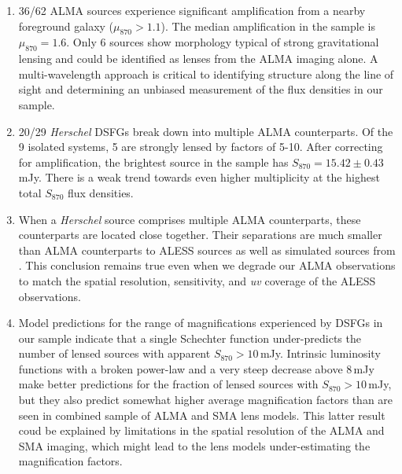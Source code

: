 \documentclass[iop]{emulateapj}
\begin{document}
\begin{enumerate}

    \item 36/62 ALMA sources experience significant amplification from a nearby
        foreground galaxy ($\mu_{870} > 1.1$).  The median amplification in the
        sample is $\mu_{870} = 1.6$.  Only 6 sources show morphology typical of
        strong gravitational lensing and could be identified as lenses from the
        ALMA imaging alone.  A multi-wavelength approach is critical to
        identifying structure along the line of sight and determining an
        unbiased measurement of the flux densities in our sample.

    \item 20/29 {\it Herschel} DSFGs break down into multiple ALMA
        counterparts.  Of the 9 isolated systems, 5 are strongly lensed by
        factors of 5-10.  After correcting for amplification, the brightest
        source in the sample has $S_{870} = 15.42 \pm 0.43\,$mJy.  There
        is a weak trend towards even higher multiplicity at the highest total
        $S_{870}$ flux densities.

    \item When a {\it Herschel} source comprises multiple ALMA counterparts,
        these counterparts are located close together.  Their separations are
        much smaller than ALMA counterparts to ALESS sources as well as
        simulated sources from \citet{HB13}.  This conclusion remains true even
        when we degrade our ALMA observations to match the spatial resolution,
        sensitivity, and {\it uv} coverage of the ALESS observations.

    \item Model predictions for the range of magnifications experienced by
        DSFGs in our sample indicate that a single Schechter function
        under-predicts the number of lensed sources with apparent $S_{870} >
        10\,$mJy.  Intrinsic luminosity functions with a broken power-law and a
        very steep decrease above 8$\,$mJy make better predictions for the
        fraction of lensed sources with $S_{870} > 10\,$mJy, but they also
        predict somewhat higher average magnification factors than are seen in
        combined sample of ALMA and SMA lens models.  This latter result coud
        be explained by limitations in the spatial resolution of the ALMA and
        SMA imaging, which might lead to the lens models under-estimating the
        magnification factors.  

\end{enumerate}
\end{document}
